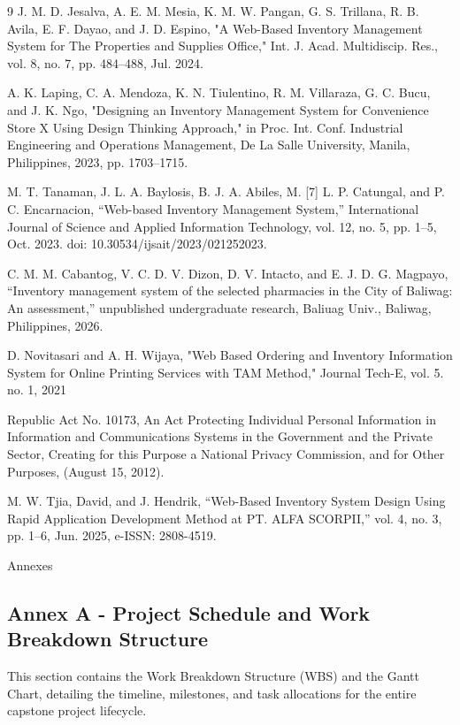 \documentclass[12pt, letterpaper]{article}
\begin{document}
\begin{thebibliography}{9}
J. M. D. Jesalva, A. E. M. Mesia, K. M. W. Pangan, G. S. Trillana, R. B. Avila, E. F. Dayao, and J. D. Espino, "A Web-Based Inventory Management System for The Properties and Supplies Office," Int. J. Acad. Multidiscip. Res., vol. 8, no. 7, pp. 484–488, Jul. 2024.

A. K. Laping, C. A. Mendoza, K. N. Tiulentino, R. M. Villaraza, G. C. Bucu, and J. K. Ngo, "Designing an Inventory Management System for Convenience Store X Using Design Thinking Approach," in Proc. Int. Conf. Industrial Engineering and Operations Management, De La Salle University, Manila, Philippines, 2023, pp. 1703–1715.

M. T. Tanaman, J. L. A. Baylosis, B. J. A. Abiles, M. [7] L. P. Catungal, and P. C. Encarnacion, “Web-based Inventory Management System,” International Journal of Science and Applied Information Technology, vol. 12, no. 5, pp. 1–5, Oct. 2023. doi: 10.30534/ijsait/2023/021252023.

C. M. M. Cabantog, V. C. D. V. Dizon, D. V. Intacto, and E. J. D. G. Magpayo, “Inventory management system of the selected pharmacies in the City of Baliwag: An assessment,” unpublished undergraduate research, Baliuag Univ., Baliwag, Philippines, 2026.

D. Novitasari and A. H. Wijaya, "Web Based Ordering and Inventory Information System for Online Printing Services with TAM Method," Journal Tech-E, vol. 5. no. 1, 2021

Republic Act No. 10173, An Act Protecting Individual Personal Information in Information and Communications Systems in the Government and the Private Sector, Creating for this Purpose a National Privacy Commission, and for Other Purposes, (August 15, 2012).

M. W. Tjia, David, and J. Hendrik, “Web-Based Inventory System Design Using Rapid Application Development Method at PT. ALFA SCORPII,” vol. 4, no. 3, pp. 1–6, Jun. 2025, e-ISSN: 2808-4519.

\end{thebibliography}
\clearpage
\thispagestyle{empty}   
\null\vfill
\begin{center}
\Huge Annexes
\end{center}
\vfill
\clearpage

\subsection*{Annex A - Project Schedule and Work Breakdown Structure}
\hspace*{2em}This section contains the Work Breakdown Structure (WBS) and the Gantt Chart, detailing the timeline, milestones, and task allocations for the entire capstone project lifecycle.	 
\clearpage
\end{document}

